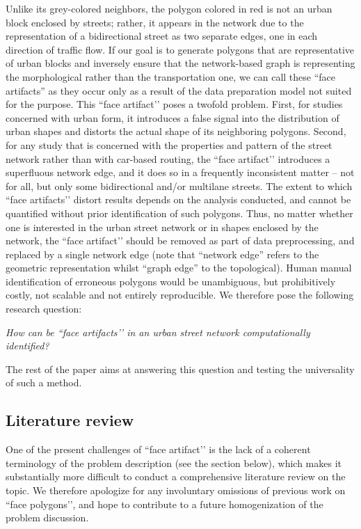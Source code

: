 Unlike its grey-colored neighbors, the polygon colored in red is not an urban block
enclosed by streets; rather, it appears in the network due to the representation of a
bidirectional street as two separate edges, one in each direction of traffic flow. If
our goal is to generate  polygons that are representative of urban blocks and inversely
ensure that the network-based graph is representing the morphological rather than the
transportation one, we can call these ``face artifacts'' as they occur only as a result
of the data preparation model not suited for the purpose. This ``face artifact’’ poses a twofold problem. First, for
studies concerned with urban form, it introduces a false signal into the distribution of
urban shapes and distorts the actual shape of its neighboring polygons. Second, for any
study that is concerned with the properties and pattern of the street network rather
than with car-based routing, the ``face artifact’’ introduces a superfluous
network edge, and it does so in a frequently inconsistent matter – not for all, but only
some bidirectional and/or multilane streets. The extent to which ``face artifacts’’ distort results depends on the analysis conducted, and cannot be
quantified without prior identification of such polygons. Thus, no matter whether one is
interested in the urban street network or in shapes enclosed by the network, the
``face artifact’’ should be removed as part of data preprocessing, and replaced
by a single network edge (note that ``network edge'' refers to the geometric
representation whilst ``graph edge'' to the topological). Human manual identification of
erroneous polygons would be unambiguous, but prohibitively costly, not scalable and not
entirely reproducible. We therefore pose the following research question:

\begin{center}
\textit{How can be ``face artifacts’’ in an urban street network computationally identified?}
\end{center}

The rest of the paper aims at answering this question and testing the universality of such
a method.

\subsection*{Literature review}

One of the present challenges of ``face artifact’’ is the lack of a
coherent terminology of the problem description (see the section below), which makes it
substantially more difficult to conduct a comprehensive literature review on the topic.
We therefore apologize for any involuntary omissions of previous work on ``face polygons’’,
and hope to contribute to a future homogenization of the problem discussion.


